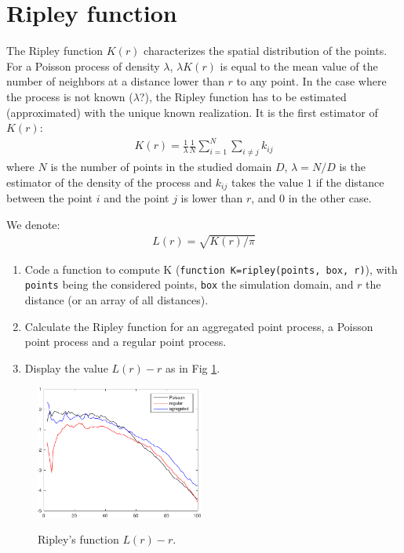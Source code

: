 \vspace*{-10pt}

\section{Ripley function}\vspace*{-3pt}
The Ripley function $K(r)$ characterizes the spatial distribution of the points.
For a Poisson process of density $\lambda$, $\lambda K(r)$ is equal to the mean value of the number of neighbors at a distance lower than 
$r$ to any point. In the case where the process is not known ($\lambda$?), the Ripley function has to be estimated (approximated) with the 
unique known realization. It is the first estimator of $K(r)$:
\begin{eqnarray}
K(r)=\frac{1}{\lambda}\frac{1}{N}\sum_{i=1}^N\sum_{i\neq j}k_{ij}
\end{eqnarray}
where $N$ is the number of points in the studied domain $D$, $\lambda=N/D$ is the estimator of the density of the process and $k_{ij}$ takes 
the value $1$ if the distance between the point $i$ and the point $j$ is lower than $r$, and $0$ in the other case.

We denote:
\begin{eqnarray}
 L(r) = \sqrt{K(r)/\pi}
\end{eqnarray}

\begin{qbox}
\begin{enumerate}
	\item Code a function to compute K (\lstinline!function K=ripley(points, box, r)!), with \lstinline!points! being the considered 
points, \lstinline!box! the simulation domain, and $r$ the distance (or an array of all distances). 
	\item Calculate the Ripley function for an aggregated point process, a Poisson point process and a regular point process.
	\item Display the value $L(r)-r$ as in Fig \ref{fig:point_process_generation:ripleyL}.
\end{enumerate}
\end{qbox}

\vspace*{-7pt}

\begin{figure}[H]
 \centering\caption{Ripley's function $L(r)-r$.}%
 \includegraphics[width=5.5cm]{../matlab/ripley.pdf}%
 \label{fig:point_process_generation:ripleyL}%
\end{figure}

